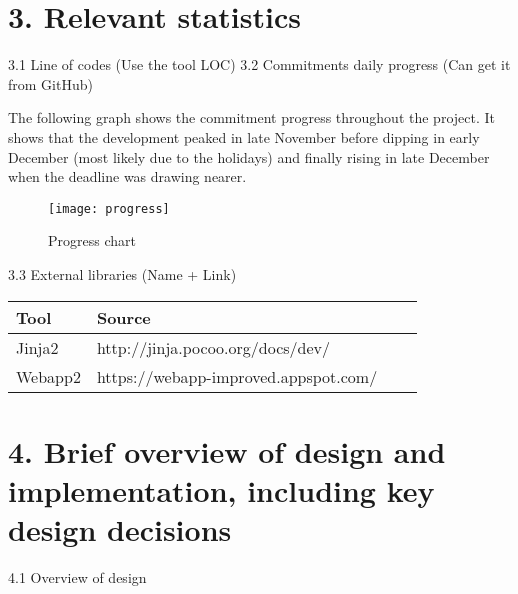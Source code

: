 \documentclass{article}
\begin{document}
\section{3. Relevant statistics}

3.1	Line of codes (Use the tool LOC)
3.2	Commitments daily progress (Can get it from GitHub)

The following graph shows the commitment progress throughout the project. It shows that the development peaked in late November before dipping in early December (most likely due to the holidays) and finally rising in late December when the deadline was drawing nearer.

\begin{figure}[h]
    \centering
    \texttt{[image: progress]}
    \caption{Progress chart}
\end{figure}

3.3	External libraries (Name + Link)

\begin{center}
    \begin{tabular}{| l | l | l | l |}
    \hline
    Tool & Source \\ \hline
    Jinja2 & http://jinja.pocoo.org/docs/dev/\\ \hline
    Webapp2 & https://webapp-improved.appspot.com/\\ \hline
    \end{tabular}
\end{center}


\section{4. Brief overview of design and implementation, including key design decisions}

4.1 Overview of design
\end{document}
